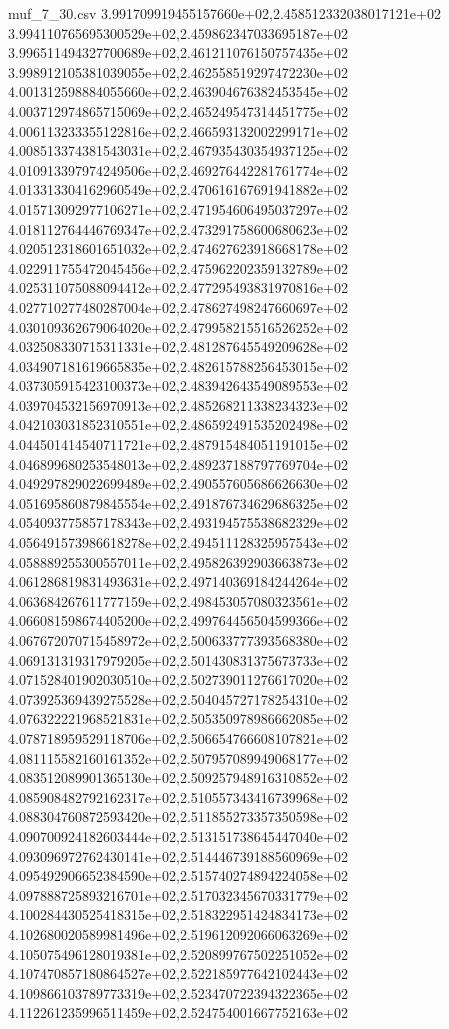 \begin{filecontents*}{muf_7_30.csv}
3.991709919455157660e+02,2.458512332038017121e+02
3.994110765695300529e+02,2.459862347033695187e+02
3.996511494327700689e+02,2.461211076150757435e+02
3.998912105381039055e+02,2.462558519297472230e+02
4.001312598884055660e+02,2.463904676382453545e+02
4.003712974865715069e+02,2.465249547314451775e+02
4.006113233355122816e+02,2.466593132002299171e+02
4.008513374381543031e+02,2.467935430354937125e+02
4.010913397974249506e+02,2.469276442281761774e+02
4.013313304162960549e+02,2.470616167691941882e+02
4.015713092977106271e+02,2.471954606495037297e+02
4.018112764446769347e+02,2.473291758600680623e+02
4.020512318601651032e+02,2.474627623918668178e+02
4.022911755472045456e+02,2.475962202359132789e+02
4.025311075088094412e+02,2.477295493831970816e+02
4.027710277480287004e+02,2.478627498247660697e+02
4.030109362679064020e+02,2.479958215516526252e+02
4.032508330715311331e+02,2.481287645549209628e+02
4.034907181619665835e+02,2.482615788256453015e+02
4.037305915423100373e+02,2.483942643549089553e+02
4.039704532156970913e+02,2.485268211338234323e+02
4.042103031852310551e+02,2.486592491535202498e+02
4.044501414540711721e+02,2.487915484051191015e+02
4.046899680253548013e+02,2.489237188797769704e+02
4.049297829022699489e+02,2.490557605686626630e+02
4.051695860879845554e+02,2.491876734629686325e+02
4.054093775857178343e+02,2.493194575538682329e+02
4.056491573986618278e+02,2.494511128325957543e+02
4.058889255300557011e+02,2.495826392903663873e+02
4.061286819831493631e+02,2.497140369184244264e+02
4.063684267611777159e+02,2.498453057080323561e+02
4.066081598674405200e+02,2.499764456504599366e+02
4.067672070715458972e+02,2.500633777393568380e+02
4.069131319317979205e+02,2.501430831375673733e+02
4.071528401902030510e+02,2.502739011276617020e+02
4.073925369439275528e+02,2.504045727178254310e+02
4.076322221968521831e+02,2.505350978986662085e+02
4.078718959529118706e+02,2.506654766608107821e+02
4.081115582160161352e+02,2.507957089949068177e+02
4.083512089901365130e+02,2.509257948916310852e+02
4.085908482792162317e+02,2.510557343416739968e+02
4.088304760872593420e+02,2.511855273357350598e+02
4.090700924182603444e+02,2.513151738645447040e+02
4.093096972762430141e+02,2.514446739188560969e+02
4.095492906652384590e+02,2.515740274894224058e+02
4.097888725893216701e+02,2.517032345670331779e+02
4.100284430525418315e+02,2.518322951424834173e+02
4.102680020589981496e+02,2.519612092066063269e+02
4.105075496128019381e+02,2.520899767502251052e+02
4.107470857180864527e+02,2.522185977642102443e+02
4.109866103789773319e+02,2.523470722394322365e+02
4.112261235996511459e+02,2.524754001667752163e+02

\end{filecontents*}
